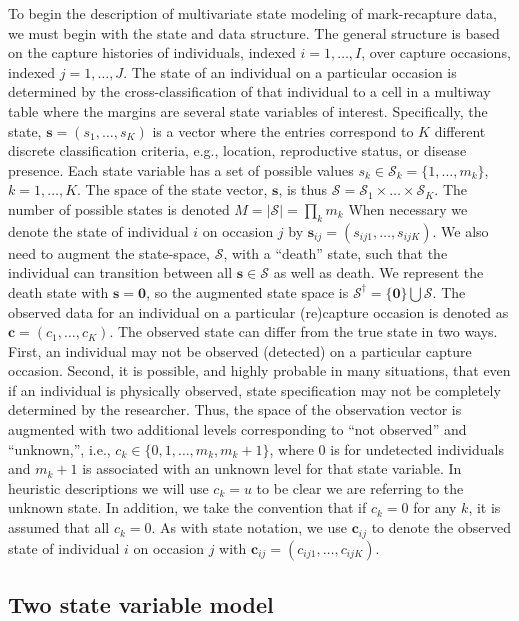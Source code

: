 \documentclass[fleqn]{article}
\newcommand{\bs}{\ensuremath{\mathbf{s}}}
\newcommand{\bc}{\ensuremath{\mathbf{c}}}
\newcommand{\fS}{\ensuremath{\mathcal{S}}}
\begin{document}
To begin the description of multivariate state modeling of mark-recapture data, we must begin with the state and data structure. The general structure is based on the capture histories of individuals, indexed $i=1,\dots,I$, over capture occasions, indexed $j=1,\dots,J$. The state of an individual on a particular occasion is determined by the cross-classification of that individual to a cell in a multiway table where the margins are several state variables of interest. Specifically, the state, $\bs = (s_1,\dots,s_K)$ is a vector where the entries correspond to $K$ different discrete classification criteria, e.g., location, reproductive status, or disease presence. Each state variable has a set of possible values $s_k \in \fS_k=\{1,\dots,m_k\}$, $k=1,\dots,K$. The space of the state vector, $\bs$, is thus $\fS = \fS_1 \times \dots \times \fS_K$. The number of possible states is denoted $M = |\fS|=\prod_k m_k$ When necessary we denote the state of individual $i$ on occasion $j$ by $\bs_{ij}=(s_{ij1},\dots,s_{ijK})$. We also need to augment the state-space, $\fS$, with a ``death'' state, such that the individual can transition between all $\bs\in\fS$ as well as death. We represent the death state with $\bs=\mathbf{0}$, so the augmented state space is $\fS^\dagger = \{\mathbf{0}\}\bigcup\fS$. The observed data for an individual on a particular (re)capture occasion is denoted as $\bc = (c_1,\dots,c_K)$. The observed state can differ from the true state in two ways. First, an individual may not be observed (detected) on a particular capture occasion. Second, it is possible, and highly probable in many situations, that even if an individual is physically observed, state specification may not be completely determined by the researcher. Thus, the space of the observation vector is augmented with two additional levels corresponding to ``not observed'' and ``unknown,'', i.e., $c_k \in \{0,1,\dots,m_k,m_k+1\}$, where 0 is for undetected individuals and $m_k+1$ is associated with an unknown level for that state variable. In heuristic descriptions we will use $c_k = u$ to be clear we are referring to the unknown state. In addition, we take the convention that if $c_k=0$ for any $k$, it is assumed that all $c_k=0$. As with state notation, we use $\bc_{ij}$ to denote the observed state of individual $i$ on occasion $j$ with $\bc_{ij}=(c_{ij1},\dots,c_{ijK})$.


\subsection{Two state variable model}
\end{document}
